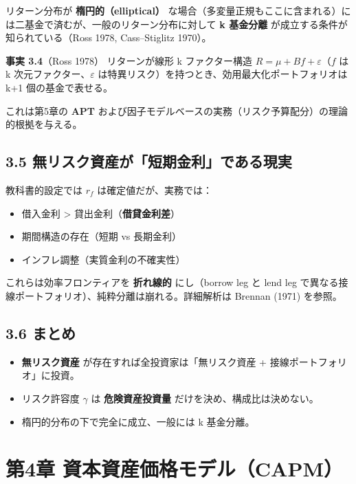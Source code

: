 \documentclass[11pt,a4paper]{report}
\begin{document}
リターン分布が \textbf{楕円的（elliptical）} な場合（多変量正規もここに含まれる）には二基金で済むが、一般のリターン分布に対して \textbf{k 基金分離} が成立する条件が知られている（Ross 1978, Cass–Stiglitz 1970）。

\textbf{事実 3.4}（Ross 1978） リターンが線形 k ファクター構造 $R = \mu + B f + \varepsilon$（$f$ は k 次元ファクター、$\varepsilon$ は特異リスク）を持つとき、効用最大化ポートフォリオは k+1 個の基金で表せる。

これは第5章の \textbf{APT} および因子モデルベースの実務（リスク予算配分）の理論的根拠を与える。

\section{3.5 無リスク資産が「短期金利」である現実}

教科書的設定では $r_f$ は確定値だが、実務では：

\begin{itemize}
\item 借入金利 > 貸出金利（\textbf{借貸金利差}）
\item 期間構造の存在（短期 vs 長期金利）
\item インフレ調整（実質金利の不確実性）
\end{itemize}

これらは効率フロンティアを \textbf{折れ線的} にし（borrow leg と lend leg で異なる接線ポートフォリオ）、純粋分離は崩れる。詳細解析は Brennan (1971) を参照。

\section{3.6 まとめ}

\begin{itemize}
\item \textbf{無リスク資産} が存在すれば全投資家は「無リスク資産 + 接線ポートフォリオ」に投資。
\item リスク許容度 $\gamma$ は \textbf{危険資産投資量} だけを決め、構成比は決めない。
\item 楕円的分布の下で完全に成立、一般には k 基金分離。
\end{itemize}

\noindent\hrulefill

\chapter{第4章 資本資産価格モデル（CAPM）}
\end{document}

